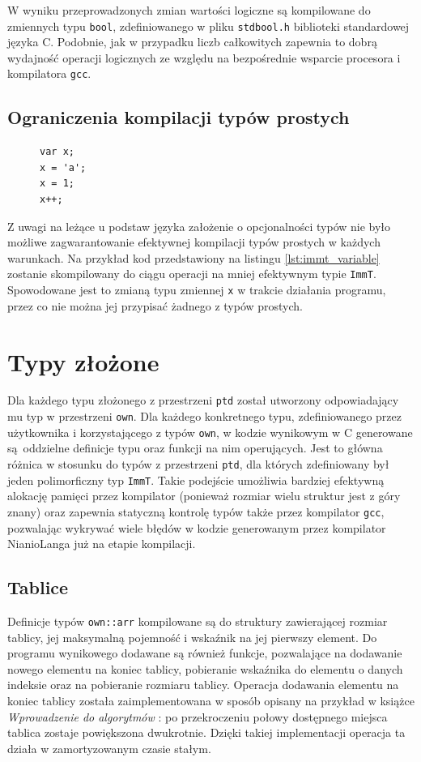\documentclass[licencjacka]{pracamgr}
\begin{document}
W wyniku przeprowadzonych zmian wartości logiczne są kompilowane do zmiennych typu \texttt{bool},
zdefiniowanego w pliku \texttt{stdbool.h} biblioteki standardowej języka C.
Podobnie, jak w przypadku liczb całkowitych zapewnia to dobrą wydajność operacji logicznych
ze względu na bezpośrednie wsparcie procesora i kompilatora \texttt{gcc}.

\subsection{Ograniczenia kompilacji typów prostych}
\begin{figure}
\begin{lstlisting}[caption={Zmienna kompilowana do typu \texttt{ImmT}},label={lst:immt_variable},aboveskip=-15pt]
var x;
x = 'a';
x = 1;
x++;
\end{lstlisting}
\end{figure}
Z uwagi na leżące u podstaw języka założenie o opcjonalności typów nie było możliwe
zagwarantowanie efektywnej kompilacji typów prostych w każdych warunkach.
Na przykład kod przedstawiony na listingu \ref{lst:immt_variable} zostanie skompilowany do ciągu operacji na mniej efektywnym typie
\texttt{ImmT}. Spowodowane jest to zmianą typu zmiennej \texttt{x} w trakcie działania programu,
przez co nie można jej przypisać żadnego z typów prostych.

\section{Typy złożone}
Dla każdego typu złożonego z przestrzeni \texttt{ptd} został utworzony odpowiadający mu typ
w przestrzeni \texttt{own}. Dla każdego konkretnego typu, zdefiniowanego przez użytkownika
i korzystającego z typów \texttt{own}, w kodzie wynikowym w C generowane są oddzielne definicje
typu oraz funkcji na nim operujących. Jest to główna różnica w stosunku do typów z przestrzeni
\texttt{ptd}, dla których zdefiniowany był jeden polimorficzny typ \texttt{ImmT}.
Takie podejście umożliwia bardziej efektywną alokację pamięci przez kompilator (ponieważ rozmiar
wielu struktur jest z góry znany) oraz zapewnia statyczną kontrolę typów także przez kompilator
\texttt{gcc}, pozwalając wykrywać wiele błędów w kodzie generowanym przez kompilator
NianioLanga już na etapie kompilacji.
\subsection{Tablice}
Definicje typów \texttt{own::arr} kompilowane są do struktury zawierającej rozmiar tablicy, jej
maksymalną pojemność i wskaźnik na jej pierwszy element. Do programu wynikowego
dodawane są również funkcje,
pozwalające na dodawanie nowego elementu na koniec tablicy, pobieranie wskaźnika do elementu
o danych indeksie oraz na pobieranie rozmiaru tablicy. Operacja dodawania elementu na koniec tablicy
została zaimplementowana w sposób opisany na przykład w książce
\textit{Wprowadzenie do algorytmów} \cite{cormen}: po przekroczeniu połowy dostępnego miejsca
tablica zostaje powiększona dwukrotnie. Dzięki takiej implementacji operacja
ta działa w zamortyzowanym czasie stałym.
\end{document}
